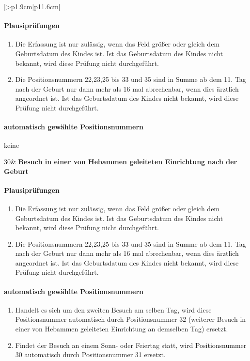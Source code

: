 \begin{mpsupertabular}{|>{\centering}p{1.9cm}|p{11.6cm}|}
\paragraph{Plausiprüfungen}
\begin{enumerate}
\item
Die Erfassung ist nur zulässig, wenn das Feld  größer 
oder gleich dem Geburtsdatum des Kindes ist. Ist das Geburtsdatum des
Kindes nicht bekannt, wird diese Prüfung nicht durchgeführt.
\item
Die Positionsnummern 22,23,25 bis 33 und 35 sind in Summe ab dem 11. Tag 
nach der Geburt nur dann mehr 
als 16 mal abrechenbar, wenn dies ärztlich angeordnet ist.
 Ist das Geburtsdatum des
Kindes nicht bekannt, wird diese Prüfung nicht durchgeführt.
\end{enumerate}
\paragraph{automatisch gewählte Positionsnummern}
keine
\\ \hline


30&
\textbf{Besuch in einer von Hebammen geleiteten Einrichtung
nach der Geburt}
\paragraph{Plausiprüfungen}
\begin{enumerate}
\item
Die Erfassung ist nur zulässig, wenn das Feld  größer 
oder gleich dem Geburtsdatum des Kindes ist. Ist das Geburtsdatum des
Kindes nicht bekannt, wird diese Prüfung nicht durchgeführt.
\item
Die Positionsnummern 22,23,25 bis 33 und 35 sind in Summe ab dem 11. Tag 
nach der Geburt nur dann mehr 
als 16 mal abrechenbar, wenn dies ärztlich angeordnet ist.
 Ist das Geburtsdatum des
Kindes nicht bekannt, wird diese Prüfung nicht durchgeführt.
\end{enumerate}
\paragraph{automatisch gewählte Positionsnummern}
\begin{enumerate}
\item
Handelt es sich um den zweiten Besuch am selben Tag, wird diese 
Positionsnummer automatisch durch Positionsnummer 32
(weiterer Besuch in einer von Hebammen geleiteten Einrichtung
 an demselben Tag)
ersetzt.
\item
Findet der Besuch an einem Sonn- oder Feiertag statt, wird 
Positionsnummer 30 automatisch durch Positionsnummer 31 ersetzt.
\end{enumerate}
\\ \hline



\end{mpsupertabular}
